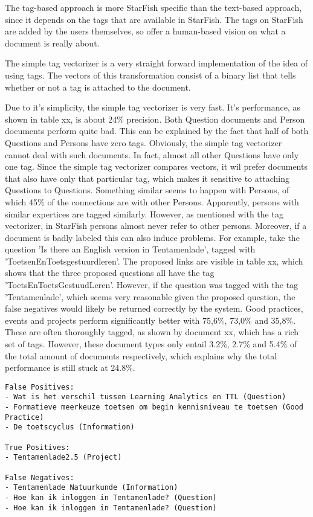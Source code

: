 The tag-based approach is more StarFish specific than the text-based approach, since it depends on the tags that are available in StarFish. The tags on StarFish are added by the users themselves, so offer a human-based vision on what a document is really about. 

The simple tag vectorizer is a very straight forward implementation of the idea of using tags. The vectors of this transformation consist of a binary list that tells whether or not a tag is attached to the document. 

Due to it's simplicity, the simple tag vectorizer is very fast. It's performance, as shown in table xx, is about 24\% precision. Both Question documents and Person documents perform quite bad. This can be explained by the fact that half of both Questions and Persons have zero tags. Obviously, the simple tag vectorizer cannot deal with such documents. In fact, almost all other Questions have only one tag. Since the simple tag vectorizer compares vectors, it wil prefer documents that also have only that particular tag, which makes it sensitive to attaching Questions to Questions. Something similar seems to happen with Persons, of which 45\% of the connections are with other Persons. Apparently, persons with similar expertices are tagged similarly. However, as mentioned with the tag vectorizer, in StarFish persons almost never refer to other persons. Moreover, if a document is badly labeled this can also induce problems. For example, take the question 'Is there an English version in Tentamenlade', tagged with 'ToetsenEnToetsgestuurdleren'. The proposed links are visible in table xx, which shows that  the three proposed questions all have the tag 'ToetsEnToetsGestuudLeren'. However, if the question was tagged with the tag 'Tentamenlade', which seems very reasonable given the proposed question, the false negatives would likely be returned correctly by the system. Good practices, events and projects perform significantly better with 75,6\%, 73,0\% and 35,8\%. These are often thoroughly tagged, as shown by document xx, which has a rich set of tags. However, these document types only entail 3.2\%, 2.7\% and 5.4\% of the total amount of documents respectively, which explains why the total performance is still stuck at 24.8\%. 

\begin{lstlisting}
False Positives:
- Wat is het verschil tussen Learning Analytics en TTL (Question)
- Formatieve meerkeuze toetsen om begin kennisniveau te toetsen (Good Practice)
- De toetscyclus (Information)

True Positives:
- Tentamenlade2.5 (Project)

False Negatives:
- Tentamenlade Natuurkunde (Information)
- Hoe kan ik inloggen in Tentamenlade? (Question)
- Hoe kan ik inloggen in Tentamenlade? (Question)
\end{lstlisting}


